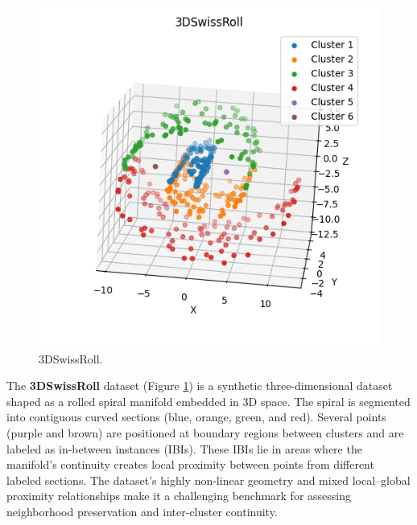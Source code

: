 \begin{figure}
    \centering
    \includegraphics[width=\myimgwidth]{images/datasets/3DSwissRoll.png}
    \caption{3DSwissRoll.}
    \label{fig:3DSwissRoll}
\end{figure}
The \textbf{3DSwissRoll} dataset (Figure \ref{fig:3DSwissRoll}) is a synthetic three-dimensional dataset shaped as a rolled spiral manifold embedded in 3D space. The spiral is segmented into contiguous curved sections (blue, orange, green, and red). Several points (purple and brown) are positioned at boundary regions between clusters and are labeled as in-between instances (IBIs). These IBIs lie in areas where the manifold’s continuity creates local proximity between points from different labeled sections. The dataset’s highly non-linear geometry and mixed local–global proximity relationships make it a challenging benchmark for assessing neighborhood preservation and inter-cluster continuity.
\newline

